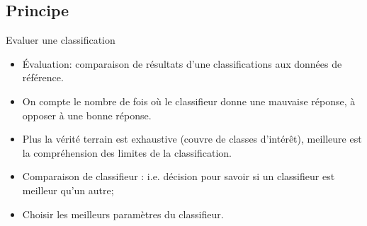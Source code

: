 \documentclass[8pt]{beamer}
\begin{document}
		\subsection{Principe}
			\begin{frame}{Evaluer une classification}
				\begin{itemize}
					\item<1-> Évaluation: comparaison de résultats d’une classifications aux données de référence.
					\item<2-> On compte le nombre de fois où le classifieur donne une mauvaise réponse, à opposer à une bonne réponse.
					\item<3-> Plus la vérité terrain est exhaustive (couvre de classes d’intérêt), meilleure est la compréhension des limites de la classification.
				\end{itemize}
			\end{frame}
			\begin{frame}{}
				\begin{itemize}
					\item<1-> Comparaison de classifieur : i.e. décision pour savoir si un classifieur est meilleur qu’un autre;
					\item<2-> Choisir les meilleurs paramètres du classifieur.
				\end{itemize}
			\end{frame}
\end{document}
